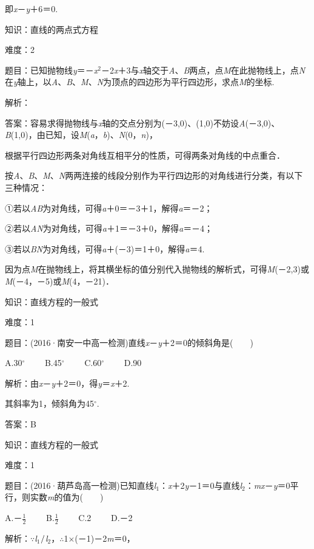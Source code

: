 \documentclass{article} %
\begin{document}
即\textit{x}－\textit{y}＋6＝0.

知识：直线的两点式方程

难度：2

题目：已知抛物线\textit{y}＝－\textit{x}${}^{2}$－2\textit{x}＋3与\textit{x}轴交于\textit{A}、\textit{B}两点，点\textit{M}在此抛物线上，点\textit{N}在\textit{y}轴上，以\textit{A}、\textit{B}、\textit{M}、\textit{N}为顶点的四边形为平行四边形，求点\textit{M}的坐标.

解析：

答案：容易求得抛物线与\textit{x}轴的交点分别为(－3,0)、(1,0)不妨设\textit{A}(－3,0)、\textit{B}(1,0)，由已知，设\textit{M}(\textit{a}，\textit{b})、\textit{N}(0，\textit{n})，

根据平行四边形两条对角线互相平分的性质，可得两条对角线的中点重合．

按\textit{A}、\textit{B}、\textit{M}、\textit{N}两两连接的线段分别作为平行四边形的对角线进行分类，有以下三种情况：

①若以\textit{AB}为对角线，可得\textit{a}＋0＝－3＋1，解得\textit{a}＝－2；

②若以\textit{AN}为对角线，可得\textit{a}＋1＝－3＋0，解得\textit{a}＝－4；

③若以\textit{BN}为对角线，可得\textit{a}＋(－3)＝1＋0，解得\textit{a}＝4.

因为点\textit{M}在抛物线上，将其横坐标的值分别代入抛物线的解析式，可得\textit{M}(－2,3)或\textit{M}(－4，－5)或\textit{M}(4，－21)．

知识：直线方程的一般式

难度：1

题目：(2016·南安一中高一检测)直线\textit{x}－\textit{y}＋2＝0的倾斜角是(　　)

A.30$\mathrm{{}^\circ}$　　 B.45$\mathrm{{}^\circ}$　　 C.60$\mathrm{{}^\circ}$　　 D.90

解析：由\textit{x}－\textit{y}＋2＝0，得\textit{y}＝\textit{x}＋2.

其斜率为1，倾斜角为45$\mathrm{{}^\circ}$.

答案：B

知识：直线方程的一般式

难度：1

题目：(2016·葫芦岛高一检测)已知直线\textit{l}${}_{1}$：\textit{x}＋2\textit{y}－1＝0与直线\textit{l}${}_{2}$：\textit{mx}－\textit{y}＝0平行，则实数\textit{m}的值为(　　)

A.－$\frac{1}{2}$　　 B.$\frac{1}{2}$　　 C.2　　 D.－2

解析：$\mathrm{\because}$\textit{l}${}_{1}$$\mathrm{\//}$\textit{l}${}_{2}$，$\mathrm{\therefore}$1$\mathrm{\times}$(－1)－2\textit{m}＝0，
\end{document}
